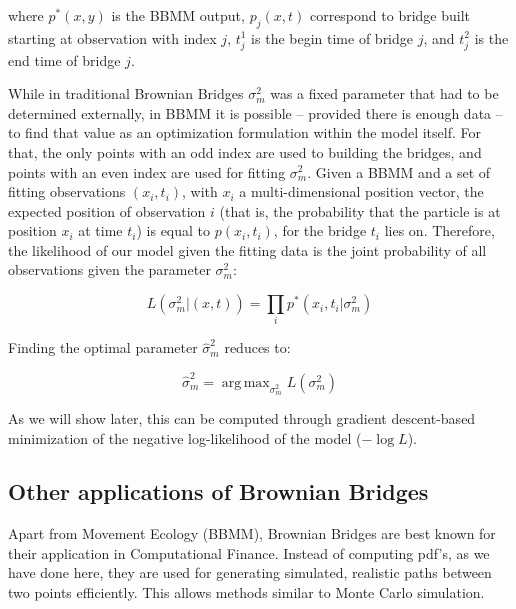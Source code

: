 \documentclass[12pt]{article}
\DeclareMathOperator*{\argmax}{arg\,max}
\begin{document}
where $p^*(x,y)$ is the BBMM output, $p_j(x,t)$ correspond to bridge built starting at observation with index $j$, $t_j^1$ is the begin time of bridge $j$, and $t_j^2$ is the end time of bridge $j$.

While in traditional Brownian Bridges $\sigma_m^2$ was a fixed parameter that had to be determined externally, in BBMM it is possible -- provided there is enough data -- to find that value as an optimization formulation within the model itself. For that, the only points with an odd index are used to building the bridges, and points with an even index are used for fitting $\sigma_m^2$. Given a BBMM and a set of fitting observations $(x_i,t_i)$, with $x_i$ a multi-dimensional position vector, the expected position of observation $i$ (that is, the probability that the particle is at position $x_i$ at time $t_i$) is equal to $p(x_i,t_i)$, for the bridge $t_i$ lies on. Therefore, the likelihood of our model given the fitting data is the joint probability of all observations given the parameter $\sigma_m^2$:

\[ L(\sigma_m^2 | (x,t)) = \prod_i p^*(x_i,t_i|\sigma_m^2) \]

Finding the optimal parameter $\hat{\sigma}_m^2$ reduces to:

\[ \hat{\sigma}_m^2 = \argmax_{\sigma_m^2} L(\sigma_m^2) \]

As we will show later, this can be computed through gradient descent-based minimization of the negative log-likelihood of the model ($-\log L$).


\subsection{Other applications of Brownian Bridges}

Apart from Movement Ecology (BBMM), Brownian Bridges are best known for their application in Computational Finance. Instead of computing pdf's, as we have done here, they are used for generating simulated, realistic paths between two points efficiently. This allows methods similar to Monte Carlo simulation.

\end{document}
